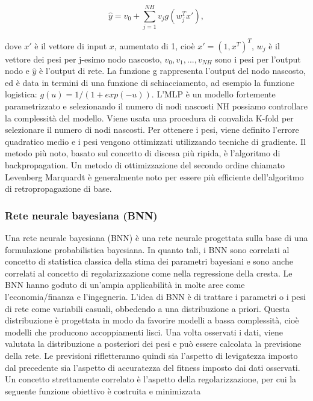 \documentclass[12pt,a4paper]{report}
\begin{document}
\begin{equation}
{\displaystyle \hat{y} = v_0 + \sum\limits_{j=1}^{NH} v_jg(w_{j}^{T}x')} ,
\end{equation}

dove $x'$ è il vettore di input $x$, aumentato di 1, cioè $ x' = (1, x^T )^T  $, $w_j$  è il vettore dei pesi per j-esimo nodo nascosto, $v_0, v_1, ..., v_{NH}$ sono i pesi per l'output nodo e $\hat{y}$ è l'output di rete. La funzione g rappresenta l'output del nodo nascosto, ed è data in termini di una funzione di schiacciamento, ad esempio la funzione logistica:
$g(u) = 1/(1 + exp(-u))$. 
L'MLP è un modello fortemente parametrizzato e selezionando il numero di nodi nascosti NH possiamo controllare la complessità del modello. Viene usata una procedura di convalida K-fold per selezionare il numero di nodi nascosti.
Per ottenere i pesi, viene definito l'errore quadratico medio e i pesi vengono ottimizzati utilizzando tecniche di gradiente. Il metodo più noto, basato sul concetto di discesa più ripida, è l'algoritmo di backpropagation. Un metodo di ottimizzazione del secondo ordine chiamato Levenberg Marquardt è generalmente noto per essere più efficiente dell'algoritmo di retropropagazione di base.


\subsubsection{Rete neurale bayesiana (BNN)}
Una rete neurale bayesiana (BNN) è una rete neurale progettata sulla base di una formulazione probabilistica bayesiana. In quanto tali, i BNN sono correlati al concetto di statistica classica della stima dei parametri bayesiani e sono anche correlati al concetto di regolarizzazione come nella regressione della cresta. Le BNN hanno goduto di un'ampia applicabilità in molte aree come l'economia/finanza e l'ingegneria. L'idea di BNN è di trattare i parametri o i pesi di rete come variabili casuali, obbedendo a una distribuzione a priori. Questa distribuzione è progettata in modo da favorire modelli a bassa complessità, cioè modelli che producono accoppiamenti lisci. Una volta osservati i dati, viene valutata la distribuzione a posteriori dei pesi e può essere calcolata la previsione della rete. Le previsioni rifletteranno quindi sia l'aspetto di levigatezza imposto dal precedente sia l'aspetto di accuratezza del fitness imposto dai dati osservati.\\
Un concetto strettamente correlato è l'aspetto della regolarizzazione, per cui la seguente funzione obiettivo è costruita e minimizzata
\end{document}
